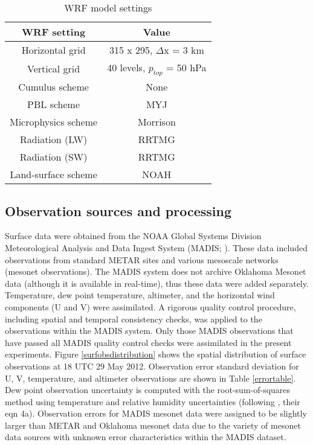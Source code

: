\begin{table}
\centering
\begin{tabular}{ c || c }
{\bf WRF setting} & {\bf Value} \\ \hline \hline
Horizontal grid & 315 x 295, \(\Delta\)x = 3 km \\ \hline
Vertical grid & 40 levels, \(p_{top}\) = 50 hPa \\ \hline
Cumulus scheme & None \\ \hline
PBL scheme & MYJ \\ \hline
Microphysics scheme & Morrison \\ \hline
Radiation (LW) & RRTMG \\ \hline
Radiation (SW) & RRTMG \\ \hline
Land-surface scheme & NOAH \\ \hline
\end{tabular}
\caption{WRF model settings}
\label{wrftable}
\end{table}

\subsection{Observation sources and processing}
Surface data were obtained from the NOAA Global Systems Division Meteorological Analysis and Data Ingest System (MADIS; \citealt{madis}). These data included observations from standard METAR sites and various mesoscale networks (mesonet observations). The MADIS system does not archive Oklahoma Mesonet data (although it is available in real-time), thus these data were added separately. Temperature, dew point temperature, altimeter, and the horizontal wind components (U and V) were assimilated. A rigorous quality control procedure, including spatial and temporal consistency checks, was applied to the observations within the MADIS system. Only those MADIS observations that have passed all MADIS quality control checks were assimilated in the present experiments. Figure \ref{surfobsdistribution} shows the spatial distribution of surface observations at 18 UTC 29 May 2012. Observation error standard deviation for U, V, temperature, and altimeter observations are shown in Table \ref{errortable}. Dew point observation uncertainty is computed with the root-sum-of-squares method using temperature and relative humidity uncertainties (following \citealt{linhubbard04}, their eqn 4a). Observation errors for MADIS mesonet data were assigned to be slightly larger than METAR and Oklahoma mesonet data due to the variety of mesonet data sources with unknown error characteristics within the MADIS dataset.

